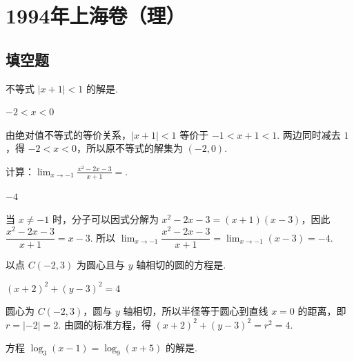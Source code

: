 \documentclass[UTF8,a4paper,oneside,11pt]{ctexbook}
\begin{document}
\mainmatter

\chapter{1994年上海卷（理）}
\section{填空题}

\begin{problem}
不等式 \(|x + 1| < 1\) 的解是\fillinblank{}.
\end{problem}

\begin{answer}
\(-2 < x < 0\)
\end{answer}

\begin{solution}
由绝对值不等式的等价关系，\(|x+1|<1\) 等价于 \(-1<x+1<1\). 两边同时减去 \(1\)，得 \(-2<x<0\)，所以原不等式的解集为 \((-2,0)\).
\end{solution}

\begin{problem}
计算：\(\displaystyle\lim_{x \to -1}\frac{x^{2} - 2x - 3}{x + 1} =\)\fillinblank{}.
\end{problem}

\begin{answer}
\(-4\)
\end{answer}

\begin{solution}
当 \(x\ne-1\) 时，分子可以因式分解为 \(x^2-2x-3=(x+1)(x-3)\)，因此
\(\dfrac{x^2-2x-3}{x+1}=x-3\). 所以
\(\displaystyle\lim_{x\to-1}\dfrac{x^2-2x-3}{x+1}=\lim_{x\to-1}(x-3)=-4\).
\end{solution}

\begin{problem}
以点 \(C(-2,3)\) 为圆心且与 \(y\) 轴相切的圆的方程是\fillinblank{}.
\end{problem}

\begin{answer}
\((x + 2)^2 + (y - 3)^2 = 4\)
\end{answer}

\begin{solution}
圆心为 \(C(-2,3)\)，圆与 \(y\) 轴相切，所以半径等于圆心到直线 \(x=0\) 的距离，即 \(r=|-2|=2\). 由圆的标准方程，得
\((x+2)^2+(y-3)^2=r^2=4\).
\end{solution}

\begin{problem}
方程 \(\log_3(x - 1) = \log_9(x + 5)\) 的解是\fillinblank{}.
\end{problem}
\end{document}

